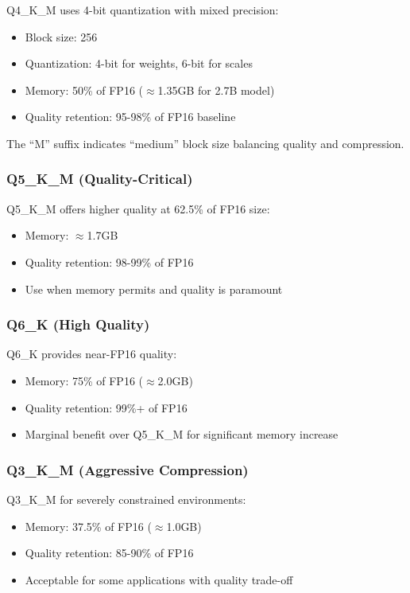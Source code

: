Q4\_K\_M uses 4-bit quantization with mixed precision:

\begin{itemize}
    \item Block size: 256
    \item Quantization: 4-bit for weights, 6-bit for scales
    \item Memory: 50\% of FP16 ($\approx$1.35GB for 2.7B model)
    \item Quality retention: 95-98\% of FP16 baseline
\end{itemize}

The ``M'' suffix indicates ``medium'' block size balancing quality and compression.

\subsubsection{Q5\_K\_M (Quality-Critical)}

Q5\_K\_M offers higher quality at 62.5\% of FP16 size:

\begin{itemize}
    \item Memory: $\approx$1.7GB
    \item Quality retention: 98-99\% of FP16
    \item Use when memory permits and quality is paramount
\end{itemize}

\subsubsection{Q6\_K (High Quality)}

Q6\_K provides near-FP16 quality:

\begin{itemize}
    \item Memory: 75\% of FP16 ($\approx$2.0GB)
    \item Quality retention: 99\%+ of FP16
    \item Marginal benefit over Q5\_K\_M for significant memory increase
\end{itemize}

\subsubsection{Q3\_K\_M (Aggressive Compression)}

Q3\_K\_M for severely constrained environments:

\begin{itemize}
    \item Memory: 37.5\% of FP16 ($\approx$1.0GB)
    \item Quality retention: 85-90\% of FP16
    \item Acceptable for some applications with quality trade-off
\end{itemize}

